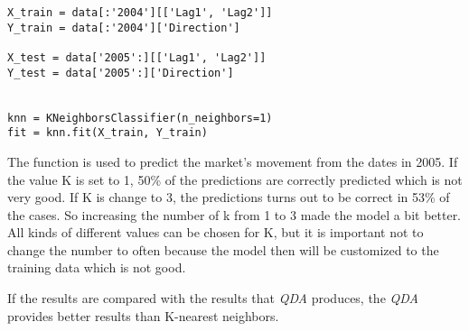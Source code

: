 \begin{lstlisting}[caption={Python K-Nearest neighbors function, where K is set to 1}, label=lst:kneighbor, mathescape=true]
X_train = data[:'2004'][['Lag1', 'Lag2']]
Y_train = data[:'2004']['Direction']

X_test = data['2005':][['Lag1', 'Lag2']]
Y_test = data['2005':]['Direction']


knn = KNeighborsClassifier(n_neighbors=1)
fit = knn.fit(X_train, Y_train)
\end{lstlisting}

The function is used to predict the market's movement from the dates in 2005. If the value K is set to 1, 50\% of the predictions are correctly predicted which is not very good.
If K is change to 3, the predictions turns out to be correct in 53\% of the cases. So increasing the number of k from 1 to 3 made the model a bit better. All kinds of different values can be chosen for K, but it is important not to change the number to often because the model then will be customized to the training data which is not good.

If the results are compared with the results that \emph{QDA} produces, the \emph{QDA} provides better results than K-nearest neighbors.